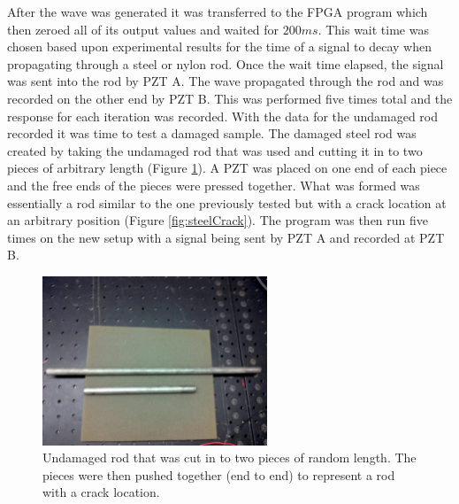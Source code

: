 After the wave was generated it was transferred to the FPGA program which then zeroed all of its output values and waited for $200ms$. This wait time was chosen based upon experimental results for the time of a signal to decay when propagating through a steel or nylon rod. Once the wait time elapsed, the signal was sent into the rod by PZT A. The wave propagated through the rod and was recorded on the other end by PZT B. This was performed five times total and the response for each iteration was recorded. With the data for the undamaged rod recorded it was time to test a damaged sample. The damaged steel rod was created  by taking the undamaged rod that was used and cutting it in to two pieces of arbitrary length (Figure \ref{fig:steelPieces}). A PZT was placed on one end of each piece and the free ends of the pieces were pressed together. What was formed was essentially a rod similar to the one previously tested but with a crack location at an arbitrary position (Figure \ref{fig:steelCrack}). The program was then run five times on the new setup with a signal being sent by PZT A and recorded at PZT B.

\begin{figure}[ht!]
\centering
\includegraphics[width=0.6\textwidth]{eps_pics/steelPieces}
\caption{Undamaged rod that was cut in to two pieces of random length. The pieces were then pushed together (end to end) to represent a rod with a crack location.
 	 \label{fig:steelPieces}} 
\end{figure}

